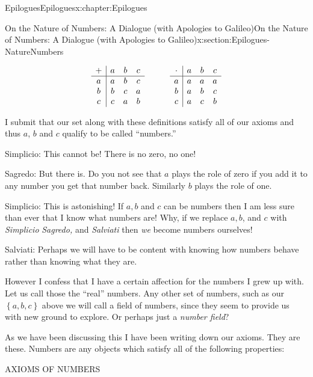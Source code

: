 \begin{chapterptx}{Epilogues}{}{Epilogues}{}{}{x:chapter:Epilogues}
\begin{sectionptx}{On the Nature of Numbers: A Dialogue (with Apologies to Galileo)}{}{On the Nature of Numbers: A Dialogue (with Apologies to Galileo)}{}{}{x:section:Epilogues-NatureNumbers}
\begin{introduction}{}
			\begin{align*}
				\begin{array}{c|ccc} 
					+& a& b& c\\\hline 
					a& a& b& c\\
					b& b& c& a\\ 
					c& c& a& b 
				\end{array}  
				& & & & & & 
				\begin{array}{c|ccc} 
					\cdot& a& b& c\\\hline 
					a& a& a& a\\ 
					b& a& b& c\\ 
					c& a& c& b 
				\end{array} 
			\end{align*}
			\par
			I submit that our set along with these definitions satisfy all of our axioms and thus \(a\), \(b\) and \(c\) qualify to be called ``numbers.''%
			\par
			\alert{Simplicio}:  This cannot be! There is no zero, no one!%
			\par
			\alert{Sagredo}:  But there is. Do you not see that \(a\) plays the role of zero \textemdash{} if you add it to any number you get that number back. Similarly \(b\) plays the role of one.%
			\par
			\alert{Simplicio}: This is astonishing! If \(a, b\) and \(c\) can be numbers then I am less sure than ever that I know what numbers are! Why, if we replace \(a, b\), and \(c\) with \emph{Simplicio} \emph{Sagredo,} and \emph{Salviati} then \emph{we} become numbers ourselves!%
			\par
			\alert{Salviati}:  Perhaps we will have to be content with knowing how numbers behave rather than knowing what they are.%
			\par
			However I confess that I have a certain affection for the numbers I grew up with. Let us call those the ``real'' numbers. Any other set of numbers, such as our \(\left\{a,b,c\right\}\) above we will call a field of numbers, since they seem to provide us with new ground to explore. Or perhaps just a \emph{number field}?%
			\par
			As we have been discussing this I have been writing down our axioms.  They are these.  Numbers are any objects which satisfy all of the following properties:%
			\par
			\alert{AXIOMS OF NUMBERS}%
			\par

\end{introduction}
\end{sectionptx}
\end{chapterptx}
